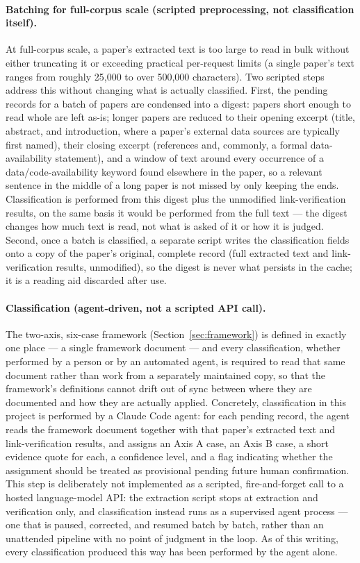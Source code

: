 \paragraph{Batching for full-corpus scale (scripted preprocessing, not classification
itself).} At full-corpus scale, a paper's extracted text is too large to read in bulk
without either truncating it or exceeding practical per-request limits (a single
paper's text ranges from roughly 25{,}000 to over 500{,}000 characters). Two scripted
steps address this without changing what is actually classified. First, the pending
records for a batch of papers are condensed into a digest: papers short enough to read
whole are left as-is; longer papers are reduced to their opening excerpt (title,
abstract, and introduction, where a paper's external data sources are typically first
named), their closing excerpt (references and, commonly, a formal data-availability
statement), and a window of text around every occurrence of a data/code-availability
keyword found elsewhere in the paper, so a relevant sentence in the middle of a long
paper is not missed by only keeping the ends. Classification is performed from this
digest plus the unmodified link-verification results, on the same basis it would be
performed from the full text --- the digest changes how much text is read, not what is
asked of it or how it is judged. Second, once a batch is classified, a separate script
writes the classification fields onto a copy of the paper's original, complete record
(full extracted text and link-verification results, unmodified), so the digest is
never what persists in the cache; it is a reading aid discarded after use.

\paragraph{Classification (agent-driven, not a scripted API call).} The two-axis,
six-case framework (Section~\ref{sec:framework}) is defined in exactly one place --- a
single framework document --- and every classification, whether performed by a person
or by an automated agent, is required to read that same document rather than work from
a separately maintained copy, so that the framework's definitions cannot drift out of
sync between where they are documented and how they are actually applied. Concretely,
classification in this project is performed by a Claude Code agent: for each pending
record, the agent reads the framework document together with that paper's extracted
text and link-verification results, and assigns an Axis A case, an Axis B case, a
short evidence quote for each, a confidence level, and a flag indicating whether the
assignment should be treated as provisional pending future human confirmation. This
step is deliberately not implemented as a scripted, fire-and-forget call to a hosted
language-model API: the extraction script stops at extraction and verification only,
and classification instead runs as a supervised agent process --- one that is paused,
corrected, and resumed batch by batch, rather than an unattended pipeline with no point
of judgment in the loop. As of this writing, every classification produced this way has
been performed by the agent alone.

